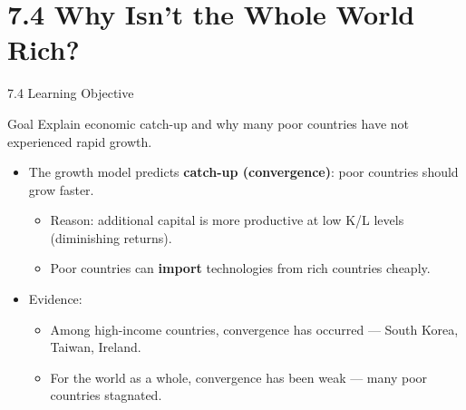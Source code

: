 \documentclass[aspectratio=169]{beamer}
\begin{document}
\section{7.4 Why Isn't the Whole World Rich?}

\begin{frame}{7.4 Learning Objective}
\transfade
\begin{block}{Goal}
Explain economic catch-up and why many poor countries have not experienced rapid growth.
\end{block}
\begin{itemize}
  \item The growth model predicts \textbf{catch-up (convergence)}: poor countries should grow faster.
  \begin{itemize}
    \item Reason: additional capital is more productive at low K/L levels (diminishing returns).
    \item Poor countries can \textbf{import} technologies from rich countries cheaply.
  \end{itemize}
  \item Evidence:
  \begin{itemize}
    \item \alert{Among high-income countries}, convergence has occurred --- South Korea, Taiwan, Ireland.
    \item \alert{For the world as a whole}, convergence has been weak --- many poor countries stagnated.
  \end{itemize}
\end{itemize}
\end{frame}
\end{document}
